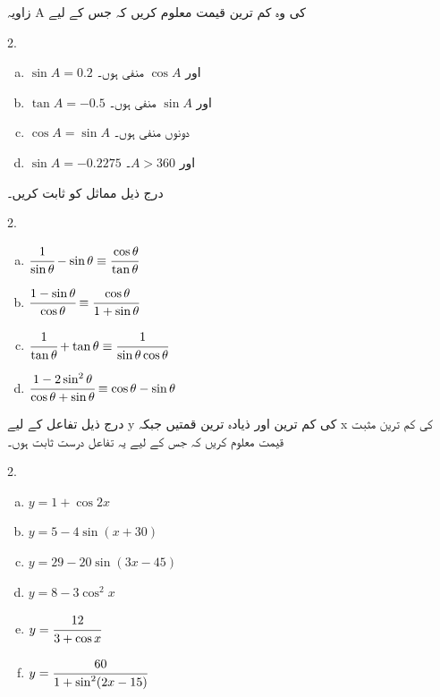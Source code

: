زاویہ A کی وہ کم ترین قیمت معلوم کریں کہ جس کے لیے
\begin{multicols}{2.}
\begin{enumerate}[a.]
\item
\(\sin A=0.2\)
اور \(\cos A\) منفی ہوں۔
\item
 \(\tan A=-0.5 \)
اور \(\sin A \) منفی ہوں۔
\item
\(\cos A=\sin A \)
دونوں منفی ہوں۔
\item
\(\sin A=-0.2275 \)
اور \(A>360 \)۔
\end{enumerate}
\end{multicols}
درج ذیل مماثل کو ثابت کریں۔
\begin{multicols}{2.}
\begin{enumerate}[a.]
\item   \(\cfrac{1}{\sin\theta}-\sin\theta\equiv\cfrac{\cos\theta}{\tan\theta} \)
\item  \(\cfrac{1-\sin\theta}{\cos\theta}\equiv\cfrac{\cos\theta}{1+\sin\theta}\)
\item    \(\cfrac{1}{\tan\theta}+\tan\theta\equiv\cfrac{1}{\sin\theta\cos\theta} \)
\item     \(\cfrac{1-2\sin^2\theta}{\cos\theta+\sin\theta}\equiv \cos\theta-\sin\theta \)
\end{enumerate}
\end{multicols}
درج ذیل تفاعل کے لیے y کی کم ترین اور ذیادہ ترین قمتیں جبکہ x کی کم ترین مثبت قیمت معلوم کریں کہ جس کے لیے یہ تفاعل درست ثابت ہوں۔
\begin{multicols}{2.}
\begin{enumerate}[a.]
\item  \(y=1+\cos2x \)
\item   \(y=5-4\sin(x+30) \)
\item     \(y=29-20\sin(3x-45) \)
\item  \(y=8-3\cos^2x \)
\item   \(y=\cfrac{12}{3+\cos x} \)
\item  \(y=\cfrac{60}{1+\sin^2(2x-15)} \)
\end{enumerate}
\end{multicols}

